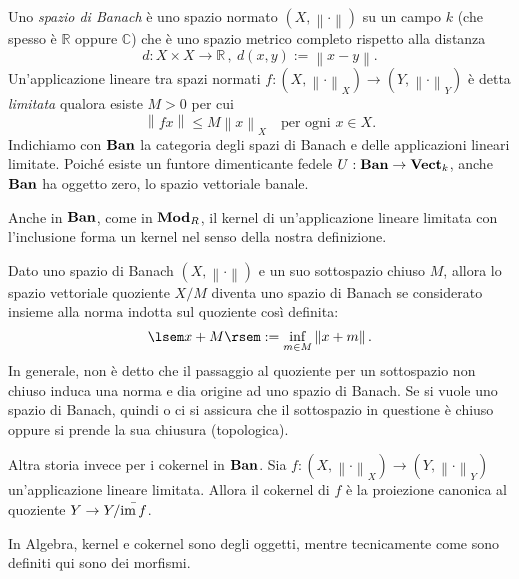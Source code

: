 \begin{recall}
  Uno {\em spazio di Banach} è uno spazio normato
  \((X, \left\lVert \cdot \right\rVert)\) su un campo \(k\) (che spesso è
  \(\mathbb{R}\) oppure \(\mathbb{C}\)) che è uno spazio metrico completo
  rispetto alla distanza
  \[
    d : X \times X \to \mathbb{R} \,, \ d(x, y) := \left\lVert x-y \right\rVert .
  \]
  Un'applicazione lineare tra spazi normati
  \(f : (X, \left\lVert \cdot \right\rVert_X) \to (Y, \left\lVert \cdot
  \right\rVert_Y)\) è detta {\em limitata} qualora esiste \(M > 0\) per
  cui
  \[
    \left\lVert f x \right\rVert \le M \left\lVert x \right\rVert_X
    \quad\text{per ogni } x \in X .
  \]
  Indichiamo con \(\mathbf{Ban}\) la categoria degli spazi di Banach e delle
  applicazioni lineari limitate. Poiché esiste un funtore dimenticante
  fedele \(U : \mathbf{Ban} \to \mathbf{Vect}_k\), anche \(\mathbf{Ban}\) ha oggetto zero, lo
  spazio vettoriale banale.
\end{recall}

\begin{example}
  Anche in \(\mathbf{Ban}\), come in \(\mathbf{Mod}_R\), il kernel di un'applicazione
  lineare limitata con l'inclusione forma un kernel nel senso della
  nostra definizione.
\end{example}

\begin{recall}
  Dato uno spazio di Banach \((X, \left\lVert \cdot \right\rVert)\) e un suo
  sottospazio chiuso \(M\), allora lo spazio vettoriale quoziente
  \(X/M\) diventa uno spazio di Banach se considerato insieme alla norma
  indotta sul quoziente così definita:
  \[
    \lsem x + M \rsem := \inf_{m \in M} \left\lVert x+m \right\rVert .
  \]
  In generale, non è detto che il passaggio al quoziente per un
  sottospazio non chiuso induca una norma e dia origine ad uno spazio di
  Banach. Se si vuole uno spazio di Banach, quindi o ci si assicura che
  il sottospazio in questione è chiuso oppure si prende la sua chiusura
  (topologica).
\end{recall}

\begin{example}
  Altra storia invece per i cokernel in \(\mathbf{Ban}\). Sia
  \(f : (X, \left\lVert \cdot \right\rVert_X) \to (Y, \left\lVert \cdot
  \right\rVert_Y)\) un'applicazione lineare limitata. Allora il cokernel
  di \(f\) è la proiezione canonica al quoziente
  \(Y \to {Y}{/}{\bar{\operatorname{im}f}}\).
\end{example}

\begin{remark}
  In Algebra, kernel e cokernel sono degli oggetti, mentre tecnicamente
  come sono definiti qui sono dei morfismi.
\end{remark}



